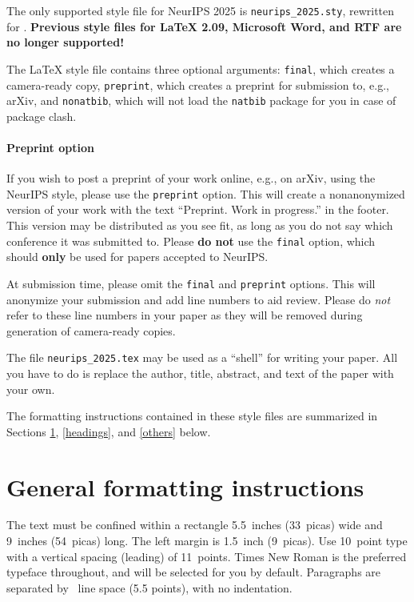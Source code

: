 \documentclass{article}
\begin{document}
The only supported style file for NeurIPS 2025 is \verb+neurips_2025.sty+,
rewritten for \LaTeXe{}.  \textbf{Previous style files for \LaTeX{} 2.09,
  Microsoft Word, and RTF are no longer supported!}


The \LaTeX{} style file contains three optional arguments: \verb+final+, which
creates a camera-ready copy, \verb+preprint+, which creates a preprint for
submission to, e.g., arXiv, and \verb+nonatbib+, which will not load the
\verb+natbib+ package for you in case of package clash.


\paragraph{Preprint option}
If you wish to post a preprint of your work online, e.g., on arXiv, using the
NeurIPS style, please use the \verb+preprint+ option. This will create a
nonanonymized version of your work with the text ``Preprint. Work in progress.''
in the footer. This version may be distributed as you see fit, as long as you do not say which conference it was submitted to. Please \textbf{do
  not} use the \verb+final+ option, which should \textbf{only} be used for
papers accepted to NeurIPS.


At submission time, please omit the \verb+final+ and \verb+preprint+
options. This will anonymize your submission and add line numbers to aid
review. Please do \emph{not} refer to these line numbers in your paper as they
will be removed during generation of camera-ready copies.


The file \verb+neurips_2025.tex+ may be used as a ``shell'' for writing your
paper. All you have to do is replace the author, title, abstract, and text of
the paper with your own.


The formatting instructions contained in these style files are summarized in
Sections \ref{gen_inst}, \ref{headings}, and \ref{others} below.


\section{General formatting instructions}
\label{gen_inst}


The text must be confined within a rectangle 5.5~inches (33~picas) wide and
9~inches (54~picas) long. The left margin is 1.5~inch (9~picas).  Use 10~point
type with a vertical spacing (leading) of 11~points.  Times New Roman is the
preferred typeface throughout, and will be selected for you by default.
Paragraphs are separated by ~line space (5.5 points), with no
indentation.
\end{document}
